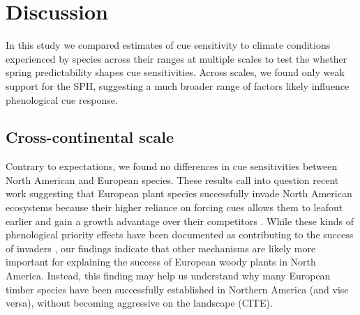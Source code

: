 \documentclass[12pt]{article}
\begin{document}
\section*{Discussion}
In this study we compared estimates of cue sensitivity to climate conditions experienced by species across their ranges at multiple scales to test the whether spring predictability shapes cue sensitivities. Across scales, we found only weak support for the SPH, suggesting a much broader range of factors likely influence phenological cue response.

\subsection{Cross-continental scale}
Contrary to expectations, we found no differences in cue sensitivities between North American and European species. These results call into question recent work suggesting that European plant species successfully invade North American ecosystems because their higher reliance on forcing cues allows them to leafout earlier and gain a growth advantage over their competitors \citep{Dawson2025}. While these kinds of phenological priority effects have been documented as contributing to the success of invaders \citep{Buonaiuto:2023wy,Alexander2019}, our findings indicate that other mechanisms are likely more important for explaining the success of European woody plants in North America. Instead, this finding 
may help us understand why many European timber species have been successfully established in Northern America (and vise versa), without becoming aggressive on the landscape (CITE). 
\end{document}
